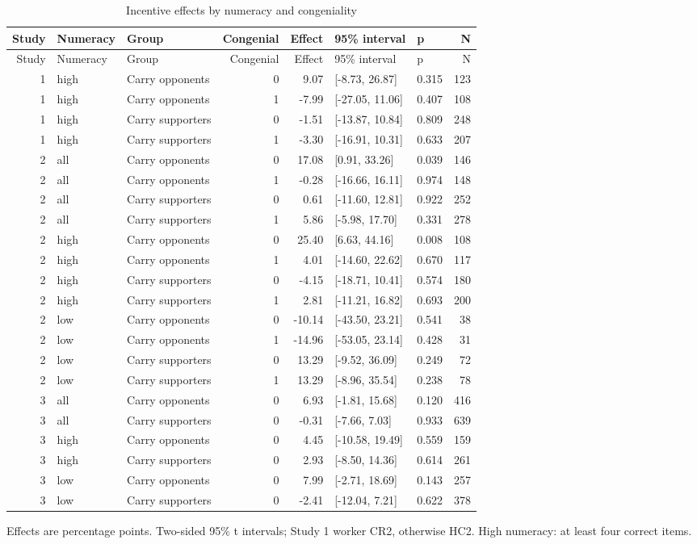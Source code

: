 
\begin{longtable}[t]{rllrrllr}
\caption{\label{tab:accnum}Incentive effects by numeracy and congeniality}\\
\toprule
Study & Numeracy & Group & Congenial & Effect & 95\% interval & p & N\\
\midrule
\endfirsthead
\toprule
Study & Numeracy & Group & Congenial & Effect & 95\% interval & p & N\\
\midrule
\endhead
1 & high & Carry opponents & 0 & 9.07 & {}[-8.73, 26.87] & 0.315 & 123\\
1 & high & Carry opponents & 1 & -7.99 & {}[-27.05, 11.06] & 0.407 & 108\\
1 & high & Carry supporters & 0 & -1.51 & {}[-13.87, 10.84] & 0.809 & 248\\
1 & high & Carry supporters & 1 & -3.30 & {}[-16.91, 10.31] & 0.633 & 207\\
2 & all & Carry opponents & 0 & 17.08 & {}[0.91, 33.26] & 0.039 & 146\\
2 & all & Carry opponents & 1 & -0.28 & {}[-16.66, 16.11] & 0.974 & 148\\
2 & all & Carry supporters & 0 & 0.61 & {}[-11.60, 12.81] & 0.922 & 252\\
2 & all & Carry supporters & 1 & 5.86 & {}[-5.98, 17.70] & 0.331 & 278\\
2 & high & Carry opponents & 0 & 25.40 & {}[6.63, 44.16] & 0.008 & 108\\
2 & high & Carry opponents & 1 & 4.01 & {}[-14.60, 22.62] & 0.670 & 117\\
2 & high & Carry supporters & 0 & -4.15 & {}[-18.71, 10.41] & 0.574 & 180\\
2 & high & Carry supporters & 1 & 2.81 & {}[-11.21, 16.82] & 0.693 & 200\\
2 & low & Carry opponents & 0 & -10.14 & {}[-43.50, 23.21] & 0.541 & 38\\
2 & low & Carry opponents & 1 & -14.96 & {}[-53.05, 23.14] & 0.428 & 31\\
2 & low & Carry supporters & 0 & 13.29 & {}[-9.52, 36.09] & 0.249 & 72\\
2 & low & Carry supporters & 1 & 13.29 & {}[-8.96, 35.54] & 0.238 & 78\\
3 & all & Carry opponents & 0 & 6.93 & {}[-1.81, 15.68] & 0.120 & 416\\
3 & all & Carry supporters & 0 & -0.31 & {}[-7.66, 7.03] & 0.933 & 639\\
3 & high & Carry opponents & 0 & 4.45 & {}[-10.58, 19.49] & 0.559 & 159\\
3 & high & Carry supporters & 0 & 2.93 & {}[-8.50, 14.36] & 0.614 & 261\\
3 & low & Carry opponents & 0 & 7.99 & {}[-2.71, 18.69] & 0.143 & 257\\
3 & low & Carry supporters & 0 & -2.41 & {}[-12.04, 7.21] & 0.622 & 378\\
\bottomrule
\end{longtable}
\noindent\footnotesize Effects are percentage points. Two-sided 95\% t intervals; Study 1 worker CR2, otherwise HC2. High numeracy: at least four correct items.\par\normalsize
